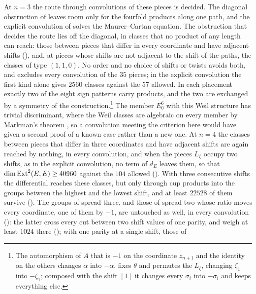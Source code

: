 \begin{remark}\label{rem:convolutionsopen}
At $n=3$ the route through convolutions of these pieces is decided. The
diagonal obstruction of  leaves room only for the
fourfold products along one path, and the explicit convolution of
 solves the Maurer--Cartan equation. The
obstruction that decides the route lies off the diagonal, in classes that no
product of any length can reach: those between pieces that differ in every coordinate and have
adjacent shifts (), and, at pieces whose shifts are not
adjacent to the shift of the paths, the classes of type $(1,1,0)$. No order
and no choice of shifts or twists avoids both, and
 excludes every convolution of the $35$ pieces; in
the explicit convolution the first kind alone gives $2560$ classes against
the $57$ allowed. In each placement exactly two of the eight sign patterns
carry products, and the two are exchanged by a symmetry of the
construction.\footnote{The automorphism of $A$ that is $-1$ on the coordinate
$z_{n+1}$ and the identity on the others changes $\alpha$ into $-\alpha$,
fixes $\theta$ and permutes the $L_{\zeta}$, changing $\zeta_{1}$ into
$-\zeta_{1}$; composed with the shift $[1]$ it changes every $\sigma_{i}$
into $-\sigma_{i}$ and keeps everything else.} The member $E_{0}^{6}$ with
this Weil structure has trivial discriminant, where the Weil classes are
algebraic on every member by Markman's theorem \cite{Mar25a,Mar25b}, so a
convolution meeting the criterion here would have given a second proof of a
known case rather than a new one. At $n=4$ the classes between pieces that
differ in three coordinates and have adjacent shifts are again reached by
nothing, in every convolution, and when the pieces $L_{\zeta}$ occupy two
shifts, as in the explicit convolution, no term of $d_{E}$ leaves them, so
that $\dim\operatorname{Ext}^{2}(E,E)\ge40960$ against the $104$ allowed
(). With three consecutive shifts the
differential reaches these classes, but only through cup products into the
groups between the highest and the lowest shift, and at least $22528$ of
them survive (). The groups of spread three, and
those of spread two whose ratio moves every coordinate, one of them by $-1$,
are untouched as well, in every convolution
(): the latter cross every cut between
two shift values of one parity, and weigh at least $1024$ there
(); with one parity at a single shift, those of

\end{remark}
